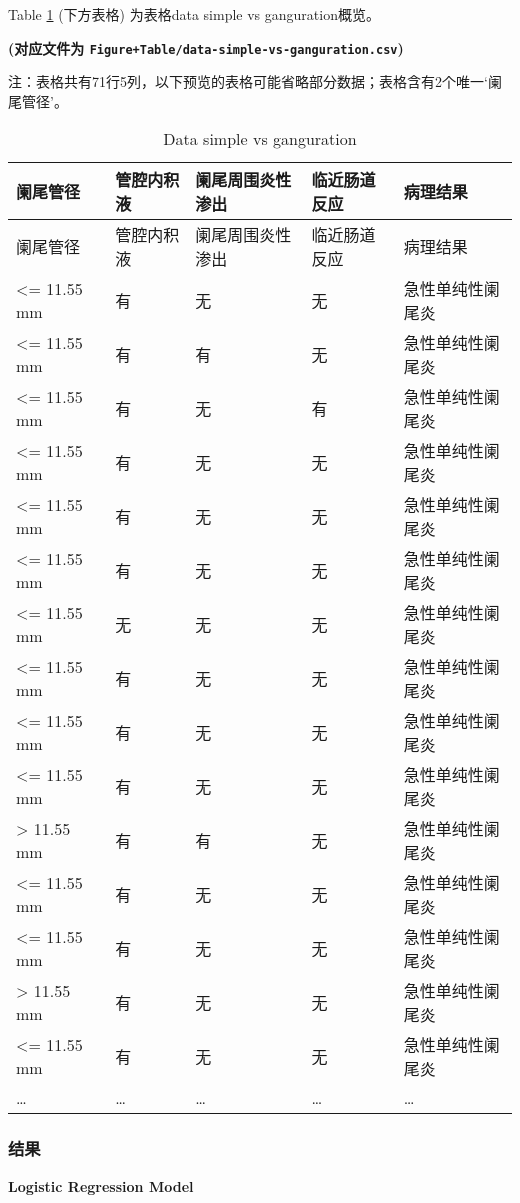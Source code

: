 \documentclass[
]{article}
\begin{document}
Table \ref{tab:data-simple-vs-ganguration} (下方表格) 为表格data simple vs ganguration概览。

\textbf{(对应文件为 \texttt{Figure+Table/data-simple-vs-ganguration.csv})}

\begin{center}\begin{tcolorbox}[colback=gray!10, colframe=gray!50, width=0.9\linewidth, arc=1mm, boxrule=0.5pt]注：表格共有71行5列，以下预览的表格可能省略部分数据；表格含有2个唯一`阑尾管径'。
\end{tcolorbox}
\end{center}

\begin{longtable}[]{@{}lllll@{}}
\caption{\label{tab:data-simple-vs-ganguration}Data simple vs ganguration}\tabularnewline
\toprule
阑尾管径 & 管腔内积液 & 阑尾周围炎性渗出 & 临近肠道反应 & 病理结果\tabularnewline
\midrule
\endfirsthead
\toprule
阑尾管径 & 管腔内积液 & 阑尾周围炎性渗出 & 临近肠道反应 & 病理结果\tabularnewline
\midrule
\endhead
\textless= 11.55 mm & 有 & 无 & 无 & 急性单纯性阑尾炎\tabularnewline
\textless= 11.55 mm & 有 & 有 & 无 & 急性单纯性阑尾炎\tabularnewline
\textless= 11.55 mm & 有 & 无 & 有 & 急性单纯性阑尾炎\tabularnewline
\textless= 11.55 mm & 有 & 无 & 无 & 急性单纯性阑尾炎\tabularnewline
\textless= 11.55 mm & 有 & 无 & 无 & 急性单纯性阑尾炎\tabularnewline
\textless= 11.55 mm & 有 & 无 & 无 & 急性单纯性阑尾炎\tabularnewline
\textless= 11.55 mm & 无 & 无 & 无 & 急性单纯性阑尾炎\tabularnewline
\textless= 11.55 mm & 有 & 无 & 无 & 急性单纯性阑尾炎\tabularnewline
\textless= 11.55 mm & 有 & 无 & 无 & 急性单纯性阑尾炎\tabularnewline
\textless= 11.55 mm & 有 & 无 & 无 & 急性单纯性阑尾炎\tabularnewline
\textgreater{} 11.55 mm & 有 & 有 & 无 & 急性单纯性阑尾炎\tabularnewline
\textless= 11.55 mm & 有 & 无 & 无 & 急性单纯性阑尾炎\tabularnewline
\textless= 11.55 mm & 有 & 无 & 无 & 急性单纯性阑尾炎\tabularnewline
\textgreater{} 11.55 mm & 有 & 无 & 无 & 急性单纯性阑尾炎\tabularnewline
\textless= 11.55 mm & 有 & 无 & 无 & 急性单纯性阑尾炎\tabularnewline
\ldots{} & \ldots{} & \ldots{} & \ldots{} & \ldots{}\tabularnewline
\bottomrule
\end{longtable}

\hypertarget{ux7ed3ux679c-2}{%
\subsubsection{结果}\label{ux7ed3ux679c-2}}

\noindent \textbf{Logistic Regression Model}
\end{document}
